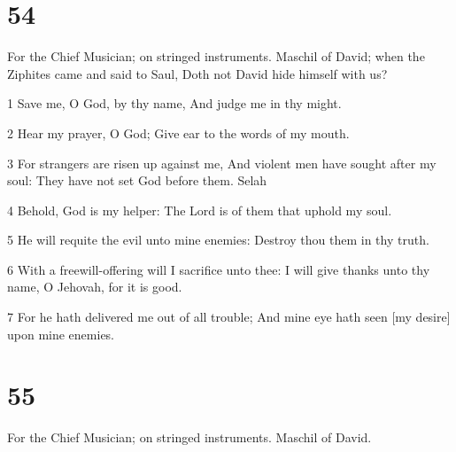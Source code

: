 \chapter{54}

\par For the Chief Musician; on stringed instruments. Maschil of David; when the Ziphites came and said to Saul, Doth not David hide himself with us?

\par 1 Save me, O God, by thy name, And judge me in thy might.
\par 2 Hear my prayer, O God; Give ear to the words of my mouth.
\par 3 For strangers are risen up against me, And violent men have sought after my soul: They have not set God before them. Selah
\par 4 Behold, God is my helper: The Lord is of them that uphold my soul.
\par 5 He will requite the evil unto mine enemies: Destroy thou them in thy truth.
\par 6 With a freewill-offering will I sacrifice unto thee: I will give thanks unto thy name, O Jehovah, for it is good.
\par 7 For he hath delivered me out of all trouble; And mine eye hath seen [my desire] upon mine enemies.

\chapter{55}

\par For the Chief Musician; on stringed instruments. Maschil of David.

